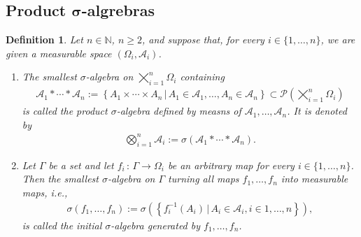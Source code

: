 \documentclass{article}
\newtheorem{definition}{Definition}[section]
\numberwithin{equation}{section}
\begin{document}
\subsection*{Product $\boldsymbol{\sigma}$-algrebras}
\begin{definition}
    Let $n\in\mathbb{N}$, $n \geq 2$, and suppose that, for every $i \in \{1,\ldots,n\}$, we are given a measurable space $(\Omega_i, \mathcal{A}_i)$.
    \begin{enumerate}
        \item The smallest $\sigma$-algebra on $\bigtimes_{i=1}^n \Omega_i$ containing
        \begin{align*}
            \mathcal{A}_1 \ast \cdots \ast \mathcal{A}_n := 
            \left\{A_1 \times \cdots \times A_n \, | \, A_1 \in \mathcal{A}_1, \ldots, A_n \in \mathcal{A}_n\right\} %
            \subset \mathcal{P}\left(\bigtimes_{i=1}^n \Omega_i\right)
        \end{align*}
        is called the product $\sigma$-algebra defined by measns of $\mathcal{A}_1,\ldots,\mathcal{A}_n$.
        It is denoted by
        \begin{align*}
            \bigotimes_{i=1}^n \mathcal{A}_i := \sigma\left(\mathcal{A}_1 \ast \cdots \ast \mathcal{A}_n\right).
        \end{align*}
        \item Let $\Gamma$ be a set and let $f_i \, : \, \Gamma \rightarrow \Omega_i$ be an arbitrary map for every $i \in \{1, \ldots, n\}$.
        Then the smallest $\sigma$-algebra on $\Gamma$ turning all maps $f_1,\ldots,f_n$ into measurable maps, i.e.,
        \begin{align*}
            \sigma(f_1, \ldots, f_n) := \sigma\left(\left\{f_i^{-1}(A_i)\, | \, A_i \in \mathcal{A}_i, i \in {1,\ldots,n}\right\}\right),
        \end{align*}
        is called the initial $\sigma$-algebra generated by $f_1, \ldots,f_n$.
    \end{enumerate}
\end{definition}
\end{document}
